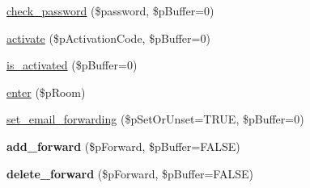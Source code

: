 \begin{DoxyCompactItemize}
\item 
\hyperlink{classsteam__user_a39a722f824a97b1ea05307609adedb86}{check\_\-password} (\$password, \$pBuffer=0)
\item 
\hyperlink{classsteam__user_a4c8b289564aeb3c0804ae924b18e95d6}{activate} (\$pActivationCode, \$pBuffer=0)
\item 
\hyperlink{classsteam__user_aa7feeaed84d0950ccfaf9ca51fb4349e}{is\_\-activated} (\$pBuffer=0)
\item 
\hyperlink{classsteam__user_a62b628e76bd03ccbcb0528c4a929e2a4}{enter} (\$pRoom)
\item 
\hyperlink{classsteam__user_a210b338363b1e507b59a40b172de1f92}{set\_\-email\_\-forwarding} (\$pSetOrUnset=TRUE, \$pBuffer=0)
\item 
\hypertarget{classsteam__user_a602c1a5a5513e95f3e180f085c0135b8}{
{\bfseries add\_\-forward} (\$pForward, \$pBuffer=FALSE)}
\label{classsteam__user_a602c1a5a5513e95f3e180f085c0135b8}

\item 
\hypertarget{classsteam__user_adc400fdb786201d984c377512b99dd27}{
{\bfseries delete\_\-forward} (\$pForward, \$pBuffer=FALSE)}
\label{classsteam__user_adc400fdb786201d984c377512b99dd27}


\end{DoxyCompactItemize}
